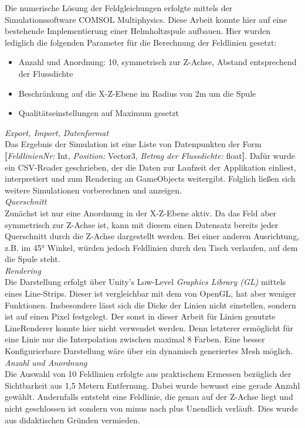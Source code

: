 Die numerische Lösung der Feldgleichungen erfolgte mittels der Simulationssoftware COMSOL Multiphysics. Diese Arbeit konnte hier auf eine bestehende Implementierung einer Helmholtzspule aufbauen. Hier wurden lediglich die folgenden Parameter für die Berechnung der Feldlinien gesetzt:
\begin{itemize}
	\setlength{\itemsep}{-1pt}
	\singlespacing
	\item Anzahl und Anordnung: 10, symmetrisch zur Z-Achse, Abstand entsprechend der Flussdichte
	\item Beschränkung auf die X-Z-Ebene im Radius von 2m um die Spule
	\item Qualitätseinstellungen auf Maximum gesetzt
\end{itemize}
\textit{Export, Import, Datenformat}\\
Das Ergebnis der Simulation ist eine Liste von Datenpunkten der Form \textbf{[}\textit{FeldlinienNr:} Int, \textit{Position:} Vector3, \textit{Betrag der Flussdichte:} float\textbf{]}. Dafür wurde ein CSV-Reader geschrieben, der die Daten zur Laufzeit der Applikation einliest, interpretiert und zum Rendering an GameObjects weitergibt. Folglich ließen sich weitere Simulationen vorberechnen und anzeigen.\\

\textit{Querschnitt}\\
Zunächst ist nur eine Anordnung in der X-Z-Ebene aktiv. Da das Feld aber symmetrisch zur Z-Achse ist, kann mit diesem einen Datensatz bereits jeder Querschnitt durch die Z-Achse dargestellt werden. Bei einer anderen Ausrichtung, z.B. im 45° Winkel, würden jedoch Feldlinien durch den Tisch verlaufen, auf dem die Spule steht.\\

\textit{Rendering}\\
Die Darstellung erfolgt über Unity's Low-Level \textit{Graphics Library (GL)} mittels eines Line-Strips. Dieser ist vergleichbar mit dem von OpenGL, hat aber weniger Funktionen. Insbesondere lässt sich die Dicke der Linien nicht einstellen, sondern ist auf einen Pixel festgelegt. Der sonst in dieser Arbeit für Linien genutzte LineRenderer konnte hier nicht verwendet werden. Denn letzterer ermöglicht für eine Linie nur die Interpolation zwischen maximal 8 Farben. Eine besser Konfigurierbare Darstellung wäre über ein dynamisch generiertes Mesh möglich.\\

\textit{Anzahl und Anordnung}\\
Die Auswahl von 10 Feldlinien erfolgte aus praktischem Ermessen bezüglich der Sichtbarkeit aus 1,5 Metern Entfernung. Dabei wurde bewusst eine gerade Anzahl gewählt. Andernfalls entsteht eine Feldlinie, die genau auf der Z-Achse liegt und nicht geschlossen ist sondern von minus nach plus Unendlich verläuft. Dies wurde aus didaktischen Gründen vermieden.\\

